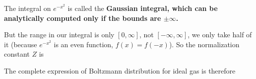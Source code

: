\documentclass[class=article, crop=false, 12pt]{standalone}
\begin{document}
The integral on $e^{-x^2}$ is called the \bf{Gaussian integral},
which can be analytically computed only if the bounds are $\pm \infty$.

But the range in our integral is only $[0,\infty]$, not $[-\infty, \infty]$,
we only take half of it (because $e^{-x^2}$ is an even function, $f(x)=f(-x)$).
So the normalization constant $Z$ is 

The complete expression of Boltzmann distribution for ideal gas is therefore
\end{document}
